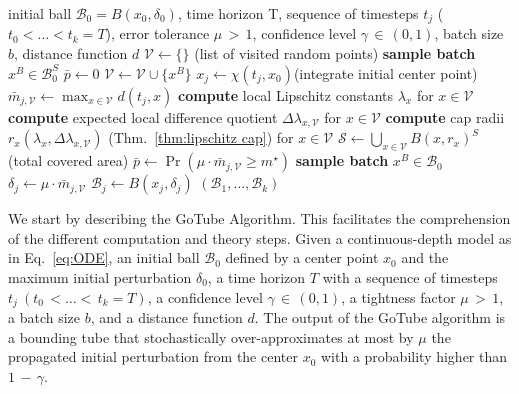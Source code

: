 \documentclass[letterpaper]{article} %
\newcommand{\rd}{\delta}
\newcommand{\calB}{\mathcal{B}}
\newcommand{\calP}{\bar{p}}
\newcommand{\calV}{\mathcal{V}}
\newcommand{\calS}{\mathcal{S}}
\begin{document}
\begin{algorithm}[t]
    \caption{GoTube}
    \label{algorithm:GoTube}
    \begin{algorithmic}[1]
    \REQUIRE initial ball $\calB_0 = B(x_0, \rd_0)$, time horizon T, sequence of timesteps $t_j$ ($t_0<\dots< t_k=T$), error tolerance $\mu\,{>}\,1$, confidence level $\gamma\,{\in}\, (0,1)$, batch size $b$, distance function $d$
    \vspace*{2mm}
    \STATE $\calV\leftarrow\{\}$ \quad(list of visited random points)
    \STATE \textbf{sample batch} $x^B \in \calB_0^S$
    \label{line:for loop Reachsets}
        \STATE $\calP\leftarrow 0$
        \WHILE{$\calP < 1 - \gamma$}
            \STATE $\calV\leftarrow \calV \cup \{x^B\}$
            \STATE $x_j \leftarrow \chi(t_j, x_0)$\quad (integrate initial center point)
            \STATE $\bar{m}_{j,\calV} \leftarrow \max_{x\in\calV} d(t_j, x)$
            \STATE \textbf{compute} local Lipschitz constants $\lambda_x$ for $x\in\calV$
            \STATE \textbf{compute} expected local difference quotient $\Delta\lambda_{x,\calV}$ for $x\in\calV$
            \STATE \textbf{compute} cap radii $r_x(\lambda_x, \Delta\lambda_{x,\calV})$ (Thm.~\ref{thm:lipschitz cap}) for $x\in\calV$\label{line:increase radii}
            \STATE $\calS\leftarrow \bigcup_{x\in\calV} B(x,r_x)^S$ \quad (total covered area)
            \STATE $\calP \leftarrow \Pr(\mu \cdot \bar{m}_{j,\calV} \ge m^\star)$
            \STATE \textbf{sample batch} $x^B \in \calB_0$
        \ENDWHILE
        \STATE $\rd_j\leftarrow \mu\cdot\bar{m}_{j,\calV}$
        \STATE $\calB_j\leftarrow B(x_j, \rd_j)$
    \ENDFOR
    \RETURN $(\calB_1,\dots,\calB_k)$
    \end{algorithmic}
\end{algorithm}

We start by describing the GoTube Algorithm. This facilitates the comprehension of the different computation and theory steps. Given a continuous-depth model as in Eq.~\eqref{eq:ODE}, an initial ball $\calB_0$ defined by a center point $x_0$ and the maximum initial perturbation $\rd_0$, a time horizon $T$ with a sequence of timesteps $t_j~(t_0\,{<}\dots{<}\,t_k=T)$, a confidence level $\gamma\,{\in}\,(0,1)$, a tightness factor $\mu\,{>}\,1$, a batch size $b$, and a distance function $d$. The output of the GoTube algorithm is a bounding tube that stochastically over-approximates at most by $\mu$ the propagated initial perturbation from the center $x_0$ with a probability higher than $1\,{-}\,\gamma$.
\end{document}
